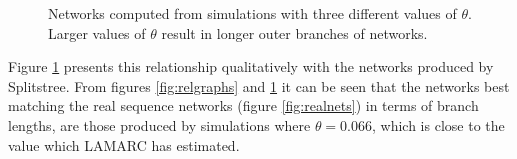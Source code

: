 \begin{figure}
\centering
{}
\caption{Networks computed from simulations with three different values of $\theta$.
Larger values of $\theta$ result in longer outer branches of networks.\label{fig:blnets}}
\end{figure}

Figure \ref{fig:blnets} presents this relationship qualitatively with the networks produced by Splitstree.
From figures \ref{fig:relgraphs} and \ref{fig:blnets} it can be seen that the networks best matching the real sequence networks (figure \ref{fig:realnets}) in terms of branch lengths, are those produced by simulations where $\theta = 0.066$, which is close to the value which LAMARC has estimated. 

